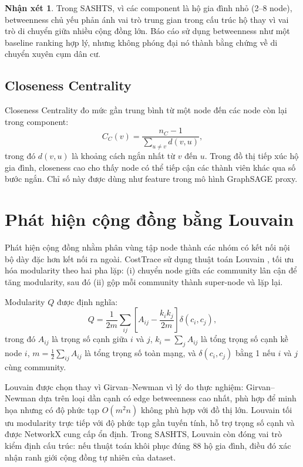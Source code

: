 \documentclass[12pt,a4paper]{report}
\theoremstyle{definition}
\newtheorem{remark}{Nhận xét}[chapter]
\begin{document}
\begin{remark}
Trong SASHTS, vì các component là hộ gia đình nhỏ (2--8 node), betweenness chủ yếu phản ánh vai trò trung gian trong cấu trúc hộ thay vì vai trò di chuyển giữa nhiều cộng đồng lớn. Báo cáo sử dụng betweenness như một baseline ranking hợp lý, nhưng không phóng đại nó thành bằng chứng về di chuyển xuyên cụm dân cư.
\end{remark}

\subsection{Closeness Centrality}

Closeness Centrality đo mức gần trung bình từ một node đến các node còn lại trong component:
\begin{equation}
  C_C(v) = \frac{n_C - 1}{\sum_{u \neq v} d(v,u)},
  \label{eq:closeness}
\end{equation}
trong đó $d(v,u)$ là khoảng cách ngắn nhất từ $v$ đến $u$. Trong đồ thị tiếp xúc hộ gia đình, closeness cao cho thấy node có thể tiếp cận các thành viên khác qua số bước ngắn. Chỉ số này được dùng như feature trong mô hình GraphSAGE proxy.

\section{Phát hiện cộng đồng bằng Louvain}

Phát hiện cộng đồng nhằm phân vùng tập node thành các nhóm có kết nối nội bộ dày đặc hơn kết nối ra ngoài. CostTrace sử dụng thuật toán Louvain \cite{louvain2008}, tối ưu hóa modularity theo hai pha lặp: (i) chuyển node giữa các community lân cận để tăng modularity, sau đó (ii) gộp mỗi community thành super-node và lặp lại.

Modularity $Q$ được định nghĩa:
\begin{equation}
  Q = \frac{1}{2m} \sum_{ij} \left[ A_{ij} - \frac{k_i k_j}{2m} \right] \delta(c_i, c_j),
  \label{eq:modularity}
\end{equation}
trong đó $A_{ij}$ là trọng số cạnh giữa $i$ và $j$, $k_i = \sum_j A_{ij}$ là tổng trọng số cạnh kề node $i$, $m = \frac{1}{2}\sum_{ij} A_{ij}$ là tổng trọng số toàn mạng, và $\delta(c_i, c_j)$ bằng 1 nếu $i$ và $j$ cùng community.

Louvain được chọn thay vì Girvan--Newman \cite{girvanNewman2002} vì lý do thực nghiệm: Girvan--Newman dựa trên loại dần cạnh có edge betweenness cao nhất, phù hợp để minh họa nhưng có độ phức tạp $O(m^2 n)$ không phù hợp với đồ thị lớn. Louvain tối ưu modularity trực tiếp với độ phức tạp gần tuyến tính, hỗ trợ trọng số cạnh và được NetworkX cung cấp ổn định. Trong SASHTS, Louvain còn đóng vai trò kiểm định cấu trúc: nếu thuật toán khôi phục đúng 88 hộ gia đình, điều đó xác nhận ranh giới cộng đồng tự nhiên của dataset.
\end{document}

